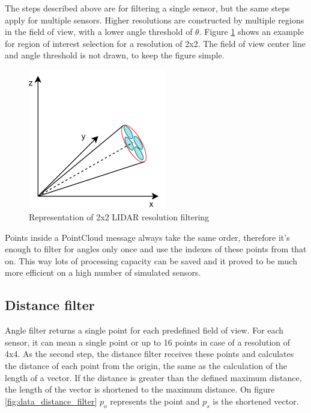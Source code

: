 The steps described above are for filtering a single sensor, but the same steps apply for multiple
sensors. Higher resolutions are constructed by multiple regions in the field of view, with a lower angle threshold of
$\theta$. Figure \ref{fig:data_angle_filter_high_res} shows an example for region of interest selection for
a resolution of 2x2. The field of view center line and angle threshold is not drawn, to keep the figure simple.

\begin{figure}[!ht]
    \centering
    \includegraphics[width=60mm, keepaspectratio]{figures/data_angle_filter_high_res.png}
    \caption{Representation of 2x2 LIDAR resolution filtering}
    \label{fig:data_angle_filter_high_res}
\end{figure}

Points inside a PointCloud message always take the same order, therefore it's enough to filter
for angles only once and use the indexes of these points from that on. This way lots of processing capacity
can be saved and it proved to be much more efficient on a high number of simulated sensors.


\subsection{Distance filter}
Angle filter returns a single point for each predefined field of view. For each sensor, it can mean a single
point or up to 16 points in case of a resolution of 4x4. As the second step, the distance filter receives these
points and calculates the distance of each point from the origin, the same as the calculation of the length
of a vector. If the distance is greater than the defined maximum distance, the length of the vector
is shortened to the maximum distance. On figure \ref{fig:data_distance_filter} $p_{o}$ represents the
point and $p_{s}$ is the shortened vector.

